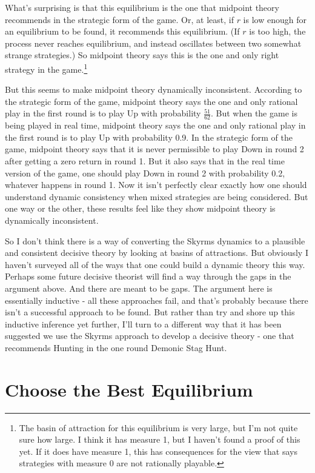 \documentclass[
  12pt,
]{article}
\begin{document}
What's surprising is that this equilibrium is the one that midpoint
theory recommends in the strategic form of the game. Or, at least, if
\(r\) is low enough for an equilibrium to be found, it recommends this
equilibrium. (If \(r\) is too high, the process never reaches
equilibrium, and instead oscillates between two somewhat strange
strategies.) So midpoint theory says this is the one and only right
strategy in the game.\footnote{The basin of attraction for this
  equilibrium is very large, but I'm not quite sure how large. I think
  it has measure 1, but I haven't found a proof of this yet. If it does
  have measure 1, this has consequences for the view that says
  strategies with measure 0 are not rationally playable.}

But this seems to make midpoint theory dynamically inconsistent.
According to the strategic form of the game, midpoint theory says the
one and only rational play in the first round is to play Up with
probability \(\frac{51}{62}\). But when the game is being played in real
time, midpoint theory says the one and only rational play in the first
round is to play Up with probability 0.9. In the strategic form of the
game, midpoint theory says that it is never permissible to play Down in
round 2 after getting a zero return in round 1. But it also says that in
the real time version of the game, one should play Down in round 2 with
probability 0.2, whatever happens in round 1. Now it isn't perfectly
clear exactly how one should understand dynamic consistency when mixed
strategies are being considered. But one way or the other, these results
feel like they show midpoint theory is dynamically inconsistent.

So I don't think there is a way of converting the Skyrms dynamics to a
plausible and consistent decisive theory by looking at basins of
attractions. But obviously I haven't surveyed all of the ways that one
could build a dynamic theory this way. Perhaps some future decisive
theorist will find a way through the gaps in the argument above. And
there are meant to be gaps. The argument here is essentially inductive -
all these approaches fail, and that's probably because there isn't a
successful approach to be found. But rather than try and shore up this
inductive inference yet further, I'll turn to a different way that it
has been suggested we use the Skyrms approach to develop a decisive
theory - one that recommends Hunting in the one round Demonic Stag Hunt.

\hypertarget{choose-the-best-equilibrium}{%
\section{Choose the Best
Equilibrium}\label{choose-the-best-equilibrium}}
\end{document}
